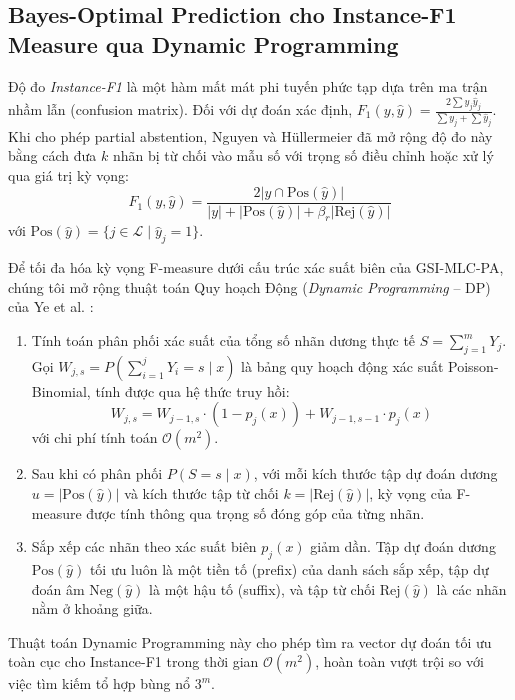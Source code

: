 \documentclass[11pt,a4paper]{article}
\begin{document}
\subsection{Bayes-Optimal Prediction cho Instance-F1 Measure qua Dynamic Programming}
Độ đo \textit{Instance-F1} là một hàm mất mát phi tuyến phức tạp dựa trên ma trận nhầm lẫn (confusion matrix). Đối với dự đoán xác định, $F_1(y, \hat{y}) = \frac{2 \sum y_j \hat{y}_j}{\sum y_j + \sum \hat{y}_j}$. Khi cho phép partial abstention, Nguyen và H\"ullermeier \cite{nguyen2021multilabel} đã mở rộng độ đo này bằng cách đưa $k$ nhãn bị từ chối vào mẫu số với trọng số điều chỉnh hoặc xử lý qua giá trị kỳ vọng:
\begin{equation}
F_1(y, \hat{y}) = \frac{2 |y \cap \mathrm{Pos}(\hat{y})|}{|y| + |\mathrm{Pos}(\hat{y})| + \beta_r |\mathrm{Rej}(\hat{y})|}
\end{equation}
với $\mathrm{Pos}(\hat{y}) = \{j \in \mathcal{L} \mid \hat{y}_j = 1\}$. 

Để tối đa hóa kỳ vọng F-measure dưới cấu trúc xác suất biên của GSI-MLC-PA, chúng tôi mở rộng thuật toán Quy hoạch Động (\textit{Dynamic Programming} -- DP) của Ye et al. \cite{ye2012optimizing}:
\begin{enumerate}
    \item Tính toán phân phối xác suất của tổng số nhãn dương thực tế $S = \sum_{j=1}^m Y_j$. Gọi $W_{j, s} = P(\sum_{i=1}^j Y_i = s \mid x)$ là bảng quy hoạch động xác suất Poisson-Binomial, tính được qua hệ thức truy hồi:
    \begin{equation}
    W_{j, s} = W_{j-1, s} \cdot (1 - p_j(x)) + W_{j-1, s-1} \cdot p_j(x)
    \end{equation}
    với chi phí tính toán $\mathcal{O}(m^2)$.
    \item Sau khi có phân phối $P(S = s \mid x)$, với mỗi kích thước tập dự đoán dương $u = |\mathrm{Pos}(\hat{y})|$ và kích thước tập từ chối $k = |\mathrm{Rej}(\hat{y})|$, kỳ vọng của F-measure được tính thông qua trọng số đóng góp của từng nhãn.
    \item Sắp xếp các nhãn theo xác suất biên $p_j(x)$ giảm dần. Tập dự đoán dương $\mathrm{Pos}(\hat{y})$ tối ưu luôn là một tiền tố (prefix) của danh sách sắp xếp, tập dự đoán âm $\mathrm{Neg}(\hat{y})$ là một hậu tố (suffix), và tập từ chối $\mathrm{Rej}(\hat{y})$ là các nhãn nằm ở khoảng giữa.
\end{enumerate}

Thuật toán Dynamic Programming này cho phép tìm ra vector dự đoán tối ưu toàn cục cho Instance-F1 trong thời gian $\mathcal{O}(m^2)$, hoàn toàn vượt trội so với việc tìm kiếm tổ hợp bùng nổ $3^m$.
\end{document}
